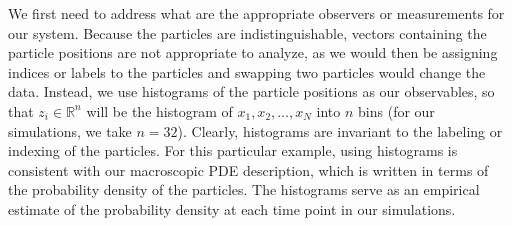 \documentclass[prl, reprint, final, showkeys]{revtex4-1}
\begin{document}
We first need to address what are the appropriate observers or measurements for our system.
%
Because the particles are indistinguishable, vectors containing the particle positions are not appropriate to analyze, as we would then be assigning indices or labels to the particles and swapping two particles would change the data.
%
Instead, we use histograms of the particle positions as our observables, so that $z_i \in \mathbb{R}^n$ will be the histogram of $x_1, x_2, \dots, x_N$ into $n$ bins (for our simulations, we take $n=32$).
%
Clearly, histograms are invariant to the labeling or indexing of the particles.
%
For this particular example, using histograms is consistent with our macroscopic PDE description, which is written in terms of the probability density of the particles.
%
The histograms serve as an empirical estimate of the probability density at each time point in our simulations.

\end{document}

